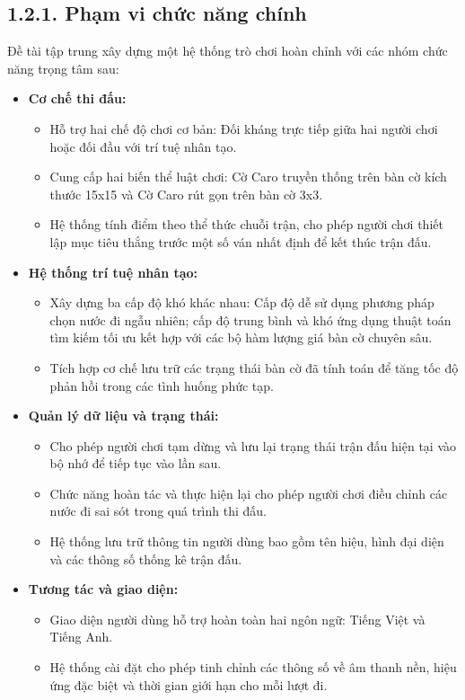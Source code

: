 \subsection*{1.2.1. Phạm vi chức năng chính}

\noindent \indent Đề tài tập trung xây dựng một hệ thống trò chơi hoàn chỉnh với các nhóm chức năng trọng tâm sau:

\begin{itemize}
    \item \textbf{Cơ chế thi đấu:}
    \begin{itemize}
        \item Hỗ trợ hai chế độ chơi cơ bản: Đối kháng trực tiếp giữa hai người chơi hoặc đối đầu với trí tuệ nhân tạo.
        \item Cung cấp hai biến thể luật chơi: Cờ Caro truyền thống trên bàn cờ kích thước 15x15 và Cờ Caro rút gọn trên bàn cờ 3x3.
        \item Hệ thống tính điểm theo thể thức chuỗi trận, cho phép người chơi thiết lập mục tiêu thắng trước một số ván nhất định để kết thúc trận đấu.
    \end{itemize}

    \item \textbf{Hệ thống trí tuệ nhân tạo:}
    \begin{itemize}
        \item Xây dựng ba cấp độ khó khác nhau: Cấp độ dễ sử dụng phương pháp chọn nước đi ngẫu nhiên; cấp độ trung bình và khó ứng dụng thuật toán tìm kiếm tối ưu kết hợp với các bộ hàm lượng giá bàn cờ chuyên sâu.
        \item Tích hợp cơ chế lưu trữ các trạng thái bàn cờ đã tính toán để tăng tốc độ phản hồi trong các tình huống phức tạp.
    \end{itemize}

    \item \textbf{Quản lý dữ liệu và trạng thái:}
    \begin{itemize}
        \item Cho phép người chơi tạm dừng và lưu lại trạng thái trận đấu hiện tại vào bộ nhớ để tiếp tục vào lần sau.
        \item Chức năng hoàn tác và thực hiện lại cho phép người chơi điều chỉnh các nước đi sai sót trong quá trình thi đấu.
        \item Hệ thống lưu trữ thông tin người dùng bao gồm tên hiệu, hình đại diện và các thông số thống kê trận đấu.
    \end{itemize}

    \item \textbf{Tương tác và giao diện:}
    \begin{itemize}
        \item Giao diện người dùng hỗ trợ hoàn toàn hai ngôn ngữ: Tiếng Việt và Tiếng Anh.
        \item Hệ thống cài đặt cho phép tinh chỉnh các thông số về âm thanh nền, hiệu ứng đặc biệt và thời gian giới hạn cho mỗi lượt đi.
    \end{itemize}
\end{itemize}

